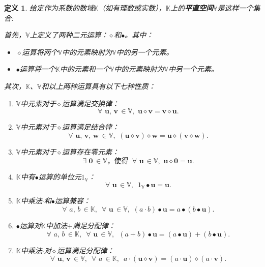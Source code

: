\documentclass[12pt,UTF8]{ctexbook}
\newtheorem{df}{定义}[section]
\begin{document}
\begin{df}
    给定作为系数的数域$\mathbb{K}$（如有理数或实数），$\mathbb{K}$上的\textbf{平直空间}$\mathbb{V}$是这样一个集合:

    首先，$\mathbb{V}$上定义了两种二元运算：$\diamond$和$\bullet$。其中：
    \begin{itemize}
        \item $\diamond$运算将两个$\mathbb{V}$中的元素映射为$\mathbb{V}$中的另一个元素。
        \item $\bullet$运算将一个$\mathbb{K}$中的元素和一个$\mathbb{V}$中的元素映射为$\mathbb{V}$中另一个元素。
    \end{itemize}
    其次，$\mathbb{K}$、$\mathbb{V}$和以上两种运算具有以下七种性质：
    \begin{enumerate}
        \item $\mathbb{V}$中元素对于$\diamond$运算满足交换律：
        $$\forall \,\, \mathbf{u}, \, \mathbf{v} \, \in \mathbb{V}, \,\, \mathbf{u} \diamond \mathbf{v} = \mathbf{v} \diamond \mathbf{u}.$$
        \item $\mathbb{V}$中元素对于$\diamond$运算满足结合律：
        $$\forall \,\, \mathbf{u}, \, \mathbf{v}, \, \mathbf{w} \, \in \mathbb{V}, \,\, (\mathbf{u} \diamond \mathbf{v}) \diamond \mathbf{w} = \mathbf{u} \diamond (\mathbf{v} \diamond \mathbf{w}).$$
        \item $\mathbb{V}$中元素对于$\diamond$运算存在零元素：
        $$\exists \,\, \mathbf{0} \, \in \mathbb{V} \mbox{，使得}\,\,\, \forall \,\, \mathbf{u} \, \in \mathbb{V}, \,\, \mathbf{u} \diamond \mathbf{0} = \mathbf{u}.$$
        \item $\mathbb{K}$中有$\bullet$运算的单位元$1_{\mathbb{V}}$：
        $$\forall \,\, \mathbf{u} \, \in \mathbb{V}, \,\,\, 1_{\mathbb{V}} \bullet \mathbf{u} = \mathbf{u}. $$
        \item $\mathbb{K}$中乘法$\cdot$和$\bullet$运算兼容：
        $$\forall \,\, a, \, b \, \in \mathbb{K}, \,\,\, \forall \,\, \mathbf{u} \, \in \mathbb{V}, \,\, (a \cdot b)\bullet\mathbf{u} = a \bullet (b\bullet\mathbf{u}).$$
        \item $\bullet$运算对$\mathbb{K}$中加法$+$满足分配律：
        $$\forall \,\, a, \, b \, \in \mathbb{K}, \,\,\, \forall \,\, \mathbf{u} \, \in \mathbb{V}, \,\,\, (a + b)\bullet\mathbf{u} = (a \bullet \mathbf{u}) + (b \bullet \mathbf{u}). $$
        \item $\mathbb{K}$中乘法$\cdot$对$\diamond$运算满足分配律：
        $$\forall \,\, \mathbf{u}, \, \mathbf{v} \, \in \mathbb{V}, \,\,\, \forall \,\, a \, \in \mathbb{K}, \,\,\, a\cdot(\mathbf{u} \diamond \mathbf{v}) = (a \cdot \mathbf{u}) \diamond (a \cdot \mathbf{v}). $$
    \end{enumerate}
\end{df}
\end{document}
